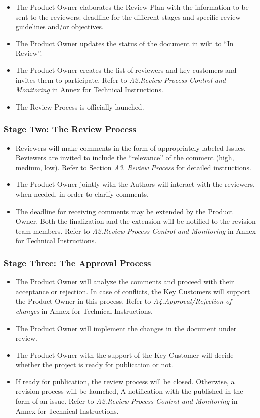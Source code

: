 \documentclass{template/openetcs_article}
\begin{document}
\begin{itemize}
\item The Product Owner elaborates the Review Plan with the information to be sent to the reviewers: deadline for the different stages and specific review guidelines and/or objectives.
\item The Product Owner updates the status of the document in wiki to “In Review”. 
\item The Product Owner creates the list of reviewers and key customers and invites them to participate. Refer to {\it A2.Review Process-Control and Monitoring} in Annex for Technical Instructions.
\item The Review Process is officially launched.
\end{itemize}

\subsubsection{Stage Two: The Review Process}

\begin{itemize}
\item Reviewers will make comments in the form of appropriately labeled Issues. Reviewers are invited to include the “relevance” of the comment (high, medium, low). Refer to Section {\it A3. Review Process} for detailed instructions.
\item The Product Owner jointly with the Authors will interact with the reviewers, when needed, in order to clarify comments.  
\item The deadline for receiving comments may be extended by the Product Owner. Both the finalization and the extension will be notified to the revision team members. Refer to {\it A2.Review Process-Control and Monitoring} in Annex for Technical Instructions.
\end{itemize}

\subsubsection{Stage Three: The Approval Process}

\begin{itemize}
\item The Product Owner will analyze the comments and proceed with their acceptance or rejection. In case of conflicts, the Key Customers will support the Product Owner in this process. Refer to {\it A4.Approval/Rejection of changes} in Annex for Technical Instructions.
\item The Product Owner will implement the changes in the document under review.  
\item The Product Owner with the support of the Key Customer will decide whether the project is ready for publication or not.
\item If ready for publication, the review process will be closed. Otherwise, a revision process will be launched, A notification with the published in the form of an issue. Refer to {\it A2.Review Process-Control and Monitoring} in Annex for Technical Instructions.
\end{itemize}
\end{document}
